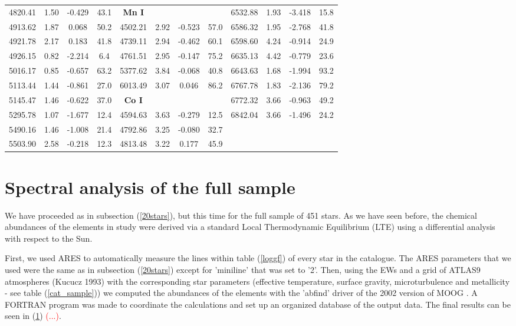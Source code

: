 \documentclass[dvips,12pt,a4paper]{report}
\begin{document}
{{\begin{table}[h]
\begin{tabular}{c c c c | c c c c | c c c c}
4820.41 & 1.50 & -0.429 &  43.1 & \textbf{Mn I} & &  &  & 6532.88 & 1.93 & -3.418 &  15.8 \\
4913.62 & 1.87 &  0.068 &  50.2 & 4502.21 & 2.92 & -0.523 &  57.0 & 6586.32 & 1.95 & -2.768 &  41.8 \\
4921.78 & 2.17 &  0.183 &  41.8 & 4739.11 & 2.94 & -0.462 &  60.1 & 6598.60 & 4.24 & -0.914 &  24.9 \\
4926.15 & 0.82 & -2.214 &   6.4 & 4761.51 & 2.95 & -0.147 &  75.2 & 6635.13 & 4.42 & -0.779 &  23.6 \\
5016.17 & 0.85 & -0.657 &  63.2 & 5377.62 & 3.84 & -0.068 &  40.8 & 6643.63 & 1.68 & -1.994 &  93.2 \\
5113.44 & 1.44 & -0.861 &  27.0 & 6013.49 & 3.07 &  0.046 &  86.2 & 6767.78 & 1.83 & -2.136 &  79.2 \\
5145.47 & 1.46 & -0.622 &  37.0 & \textbf{Co I} &  & &  & 6772.32 & 3.66 & -0.963 &  49.2 \\
5295.78 & 1.07 & -1.677 &  12.4 & 4594.63 & 3.63 & -0.279 &  12.5 & 6842.04 & 3.66 & -1.496 &  24.2 \\
5490.16 & 1.46 & -1.008 &  21.4 & 4792.86 & 3.25 & -0.080 &  32.7 \\ 
5503.90 & 2.58 & -0.218 &  12.3 & 4813.48 & 3.22 &  0.177 &  45.9 \\
\hline
\end{tabular}
\end {table}

\section {Spectral analysis of the full sample}

We have proceeded as in subsection (\ref{20stars}), but this time for the full sample of 451 stars. As we have seen before, the chemical abundances of the elements in study were derived via a standard Local Thermodynamic Equilibrium (LTE) using a  differential analysis with respect to the Sun. 

First, we used ARES to automatically measure the lines within table (\ref{loggf}) of every star in the catalogue. The ARES parameters that we used were the same as in subsection (\ref{20stars}) except for 'miniline' that was set to '2'. Then, using the EWs and a grid of ATLAS9 atmospheres (Kucucz 1993) with the corresponding star parameters (effective temperature, surface gravity, microturbulence and metallicity - see table (\ref{cat_sample})) we computed the abundances of the elements with the 'abfind' driver of the 2002 version of MOOG \citep{Sneden-1973}. A FORTRAN program was made to coordinate the calculations and set up an organized database of the output data. The final results can be seen in (\ref{}) \textcolor{red}{(...)}. 

}}
\end{document}
